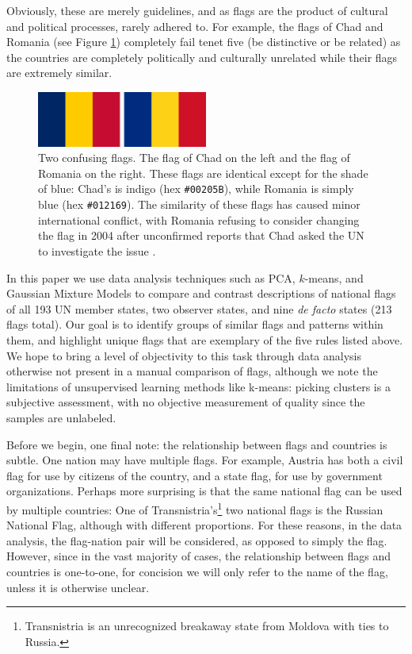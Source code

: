 \documentclass[11pt]{amsart}
\newcommand{\todo}[1]{\textcolor{red}{TODO: #1}}
\begin{document}
Obviously, these are merely guidelines, and as flags are the product of cultural
and political processes, rarely adhered to. For example, the flags of Chad and
Romania (see Figure \ref{fig:chad-romania}) completely fail tenet five (be
distinctive or be related) as the countries are completely politically and
culturally unrelated while their flags are extremely similar.

\begin{figure}[h!]
    \centering
    \includegraphics[width=0.5\textwidth]{./res/left_chad_right_romania.png}
    \caption{Two confusing flags. The flag of Chad on the left and the flag of
    Romania on the right. These flags are identical except for the shade of
    blue: Chad's is indigo (hex \texttt{\#00205B}), while Romania is simply blue (hex
    \texttt{\#012169}). The similarity of these flags has caused minor international
    conflict, with Romania refusing to consider changing the flag in 2004 after
    unconfirmed reports that Chad asked the UN to investigate the issue
    \cite{bbc-identical-flag}. \label{fig:chad-romania}}
\end{figure}

In this paper we use data analysis techniques such as PCA, \(k\)-means, and
Gaussian Mixture Models to compare and contrast descriptions of national flags
of all 193 UN member states, two observer states, and nine \emph{de facto}
states (213 flags total). Our goal is to identify groups of similar flags and
patterns within them, and highlight unique flags that are exemplary of the five
rules listed above. We hope to bring a level of objectivity to this task through
data analysis otherwise not present in a manual comparison of flags, although we
note the limitations of unsupervised learning methods like k-means: picking
clusters is a subjective assessment, with no objective measurement of quality
since the samples are unlabeled.

Before we begin, one final note: the relationship between flags and countries is
subtle. One nation may have multiple flags. For example, Austria has both a
civil flag for use by citizens of the country, and a state flag, for use by
government organizations. Perhaps more surprising is that the same national flag
can be used by multiple countries: One of Transnistria's\footnote{Transnistria
is an unrecognized breakaway state from Moldova with ties to Russia.} two
national flags is the Russian National Flag, although with different
proportions. For these reasons, in the data analysis, the flag-nation pair will
be considered, as opposed to simply the flag. However, since in the vast
majority of cases, the relationship between flags and countries is one-to-one,
for concision we will only refer to the name of the flag, unless it is otherwise
unclear.
\end{document}
